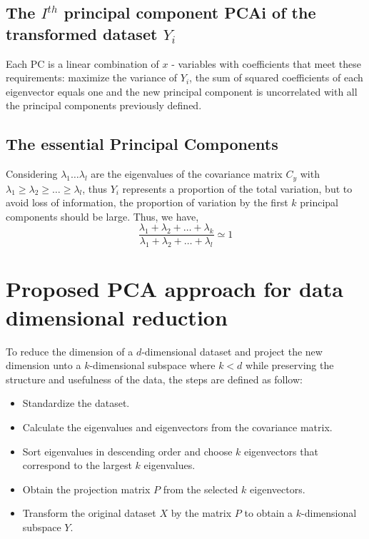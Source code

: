\documentclass[conference]{IEEEtran}
\begin{document}
\subsection{The ${{I}^{th}}$ principal component PCAi of the transformed dataset ${{Y}_{i}}$}                          
Each PC is a linear combination of $x$ - variables with coefficients that meet these requirements: maximize the variance of ${{Y}_{i}}$, the sum of squared coefficients of each eigenvector equals one and the new principal component is uncorrelated with all the principal components previously defined.
 
\subsection{The essential Principal Components}
Considering ${{\lambda }_{1}}\ldots {{\lambda }_{l}}$ are the eigenvalues of the covariance matrix ${{C}_{y}}$ with ${{\lambda }_{1}}\ge {{\lambda }_{2}}\ge \ldots \ge {{\lambda }_{l}}$, thus ${{Y}_{i}}$ represents a proportion of the total variation, but to avoid loss of information, the proportion of variation by the first $k$ principal components should be large. Thus, we have,
\begin{equation}
\frac{{{\lambda }_{1}}+{{\lambda }_{2}}+\ldots +{{\lambda }_{k}}}{{{\lambda }_{1}}+{{\lambda }_{2}}+\ldots +{{\lambda }_{l}}}\simeq 1
\end{equation}

\section{Proposed PCA approach for data dimensional reduction}
To reduce the dimension of a $d$-dimensional dataset and project the new dimension unto a $k$-dimensional subspace where $k<d$ while preserving the structure and usefulness of the data, the steps are defined as follow:
\begin{itemize}
\item	Standardize the dataset.
\item	Calculate the eigenvalues and eigenvectors from the covariance matrix.
\item 	Sort eigenvalues in descending order and choose $k$ eigenvectors that correspond to the largest $k$ eigenvalues.
\item Obtain the projection matrix $P$ from the selected $k$ eigenvectors.
\item Transform the original dataset $X$ by the matrix $P$ to obtain a $k$-dimensional subspace $Y$.
\end{itemize}
\end{document}
